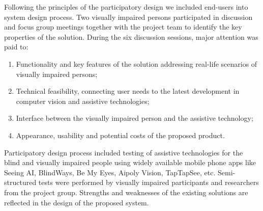 \documentclass[10pt,conference,compsocconf]{IEEEtran}
\begin{document}
Following the principles of the participatory design \cite{Kensing}\cite{Carroll} we included end-users into system design process. Two visually impaired persons participated in discussion and focus group meetings together with the project team to identify the key properties of the solution. During the six discussion sessions, major attention was paid to:
\begin{enumerate}
\item Functionality and key features of the solution addressing real-life scenarios of visually impaired persons;
\item Technical feasibility, connecting user needs to the latest development in computer vision and assistive technologies;
\item Interface between the visually impaired person and the assistive technology;
\item Appearance, usability and potential costs of the proposed product. 
\end{enumerate}
Participatory design process included testing of assistive technologies for the blind and visually impaired people using widely available mobile phone apps like Seeing AI, BlindWays, Be My Eyes, Aipoly Vision, TapTapSee, etc.
Semi-structured tests were performed by visually impaired participants and researchers from the project group. Strengths and weaknesses of the existing solutions are reflected in the design of the proposed system. 
\end{document}
